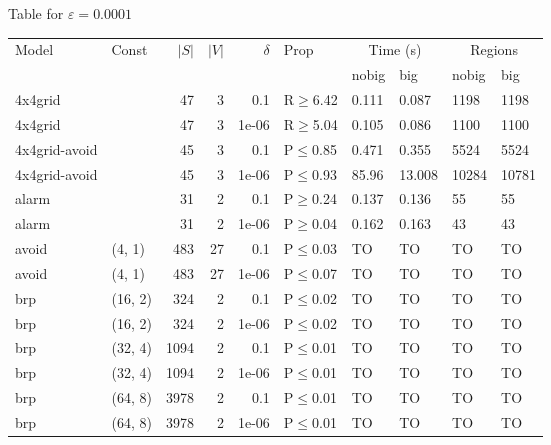 \small Table for \(\varepsilon=0.0001\)
\begin{longtable}{llrrrlllll}

        \toprule
        Model & Const & $|S|$ & $|V|$ & $\delta$ & Prop & \multicolumn{2}{c}{Time (s)} & \multicolumn{2}{c}{Regions} \\
        \cmidrule(ll){7-8} \cmidrule(ll){9-10}
        & & & & & & nobig & big & nobig & big \\
        \midrule
        
 4x4grid       &           &     	47 &   3 & 0.1   & R$\geq$6.42  & 0.111    & 0.087    & 1198   & 1198   \\
 4x4grid       &           &     	47 &   3 & 1e-06 & R$\geq$5.04  & 0.105    & 0.086    & 1100   & 1100   \\
 4x4grid-avoid &           &     	45 &   3 & 0.1   & P$\leq$0.85  & 0.471    & 0.355    & 5524   & 5524   \\
 4x4grid-avoid &           &     	45 &   3 & 1e-06 & P$\leq$0.93  & 85.96    & 13.008   & 10284  & 10781  \\
 alarm         &           &     	31 &   2 & 0.1   & P$\geq$0.24  & 0.137    & 0.136    & 55     & 55     \\
 alarm         &           &     	31 &   2 & 1e-06 & P$\geq$0.04  & 0.162    & 0.163    & 43     & 43     \\
 avoid         & (4, 1)    &    	483 &  27 & 0.1   & P$\leq$0.03  & TO       & TO       & TO     & TO     \\
 avoid         & (4, 1)    &    	483 &  27 & 1e-06 & P$\leq$0.07  & TO       & TO       & TO     & TO     \\
 brp           & (16, 2)   &    	324 &   2 & 0.1   & P$\leq$0.02  & TO       & TO       & TO     & TO     \\
 brp           & (16, 2)   &    	324 &   2 & 1e-06 & P$\leq$0.02  & TO       & TO       & TO     & TO     \\
 brp           & (32, 4)   &   	1094 &   2 & 0.1   & P$\leq$0.01  & TO       & TO       & TO     & TO     \\
 brp           & (32, 4)   &   	1094 &   2 & 1e-06 & P$\leq$0.01  & TO       & TO       & TO     & TO     \\
 brp           & (64, 8)   &   	3978 &   2 & 0.1   & P$\leq$0.01  & TO       & TO       & TO     & TO     \\
 brp           & (64, 8)   &   	3978 &   2 & 1e-06 & P$\leq$0.01  & TO       & TO       & TO     & TO     \\

\end{longtable}
